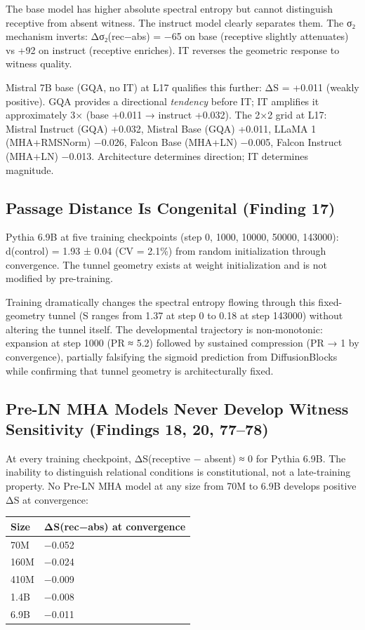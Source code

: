 \documentclass[12pt]{article}
\begin{document}
The base model has higher absolute spectral entropy but cannot distinguish receptive from absent witness. The instruct model clearly separates them. The σ₂ mechanism inverts: Δσ₂(rec−abs) = −65 on base (receptive slightly attenuates) vs +92 on instruct (receptive enriches). IT reverses the geometric response to witness quality.

Mistral 7B base (GQA, no IT) at L17 qualifies this further: ΔS = +0.011 (weakly positive). GQA provides a directional \textit{tendency} before IT; IT amplifies it approximately 3× (base +0.011 → instruct +0.032). The 2×2 grid at L17: Mistral Instruct (GQA) +0.032, Mistral Base (GQA) +0.011, LLaMA 1 (MHA+RMSNorm) −0.026, Falcon Base (MHA+LN) −0.005, Falcon Instruct (MHA+LN) −0.013. Architecture determines direction; IT determines magnitude.

\subsection{Passage Distance Is Congenital (Finding 17)}

Pythia 6.9B at five training checkpoints (step 0, 1000, 10000, 50000, 143000): d(control) = 1.93 ± 0.04 (CV = 2.1\%) from random initialization through convergence. The tunnel geometry exists at weight initialization and is not modified by pre-training.

Training dramatically changes the spectral entropy flowing through this fixed-geometry tunnel (S ranges from 1.37 at step 0 to 0.18 at step 143000) without altering the tunnel itself. The developmental trajectory is non-monotonic: expansion at step 1000 (PR ≈ 5.2) followed by sustained compression (PR → 1 by convergence), partially falsifying the sigmoid prediction from DiffusionBlocks while confirming that tunnel geometry is architecturally fixed.

\subsection{Pre-LN MHA Models Never Develop Witness Sensitivity (Findings 18, 20, 77–78)}

At every training checkpoint, ΔS(receptive − absent) ≈ 0 for Pythia 6.9B. The inability to distinguish relational conditions is constitutional, not a late-training property. No Pre-LN MHA model at any size from 70M to 6.9B develops positive ΔS at convergence:

\begin{table}[h]
\centering
\small
\begin{tabular}{ll}
\toprule
\textbf{Size} & \textbf{ΔS(rec−abs) at convergence} \\
\midrule
70M & −0.052 \\
160M & −0.024 \\
410M & −0.009 \\
1.4B & −0.008 \\
6.9B & −0.011 \\
\bottomrule
\end{tabular}
\end{table}
\end{document}
